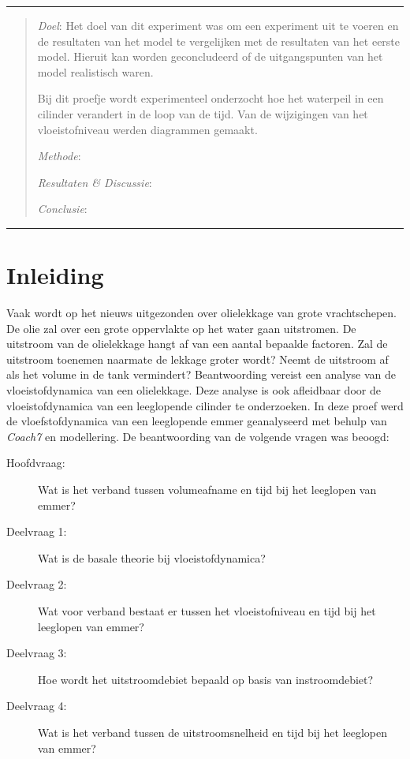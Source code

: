 \documentclass[numbers=endperiod]{scrartcl}
\begin{document}

\hrule
\begin{abstract}
    \textit{Doel}: Het doel van dit experiment was om een experiment uit te voeren en de resultaten van het model te vergelijken met de resultaten van het eerste model. Hieruit kan worden geconcludeerd of de uitgangspunten van het model realistisch waren.
    
    Bij dit proefje wordt experimenteel onderzocht hoe het waterpeil in een cilinder verandert in de loop van de tijd. Van de wijzigingen van het vloeistofniveau werden diagrammen gemaakt.  

    \textit{Methode}:

    \textit{Resultaten \& Discussie}:

    \textit{Conclusie}:
\end{abstract}
\hrule
\newpage
\section{Inleiding}
Vaak wordt op het nieuws uitgezonden over olielekkage van grote vrachtschepen. De olie zal over een grote oppervlakte op het water gaan uitstromen. De uitstroom van de olielekkage hangt af van een aantal bepaalde factoren. Zal de uitstroom toenemen naarmate de lekkage groter wordt? Neemt de uitstroom af als het volume in de tank vermindert? Beantwoording vereist een analyse van de vloeistofdynamica van een olielekkage. Deze analyse is ook afleidbaar door de vloeistofdynamica van een leeglopende cilinder te onderzoeken. In deze proef werd de vloefstofdynamica van een leeglopende emmer geanalyseerd met behulp van \textit{Coach7} en modellering. De beantwoording van de volgende vragen was beoogd:

\begin{description}
\item[Hoofdvraag:] Wat is het verband tussen volumeafname en tijd bij het leeglopen van emmer?

\item[Deelvraag 1:] Wat is de basale theorie bij vloeistofdynamica?

\item[Deelvraag 2:] Wat voor verband bestaat er tussen het vloeistofniveau en tijd bij het leeglopen van emmer?

\item[Deelvraag 3:] Hoe wordt het uitstroomdebiet bepaald op basis van instroomdebiet?

\item[Deelvraag 4:] Wat is het verband tussen de uitstroomsnelheid en tijd bij het leeglopen van emmer?
\end{description}
\end{document}
